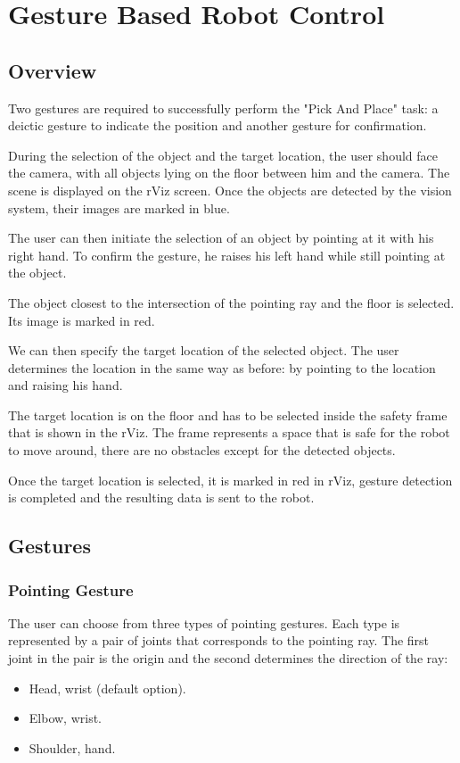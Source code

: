 \chapter{Gesture Based Robot Control}

\section{Overview}
Two gestures are required to successfully perform the "Pick And Place" task:
a deictic gesture to indicate the position and another gesture for confirmation.\par
During the selection of the object and the target location, the user should face the camera, with all objects lying on the floor between him and the camera. The scene is displayed on the rViz screen. Once the objects are detected by the vision system, their images are marked in blue.\par
The user can then initiate the selection of an object by pointing at it with his right hand. To confirm the gesture, he raises his left hand while still pointing at the object.\par
The object closest to the intersection of the pointing ray and the floor is selected. Its image is marked in red.\par
We can then specify the target location of the selected object. The user determines the location in the same way as before: by pointing to the location and raising his hand.\par
The target location is on the floor and  has to be selected inside the safety frame that is shown in the rViz. The frame represents a space that is safe for the robot to move around, there are no obstacles except for the detected objects.\par
Once the target location is selected, it is marked in red in rViz, gesture detection is completed and the resulting data is sent to the robot.\par

\section{Gestures}

\subsection{Pointing Gesture}
The user can choose from three types of pointing gestures. Each type is represented by a pair of joints that corresponds to the pointing ray. The first joint in the pair is the origin and the second determines the direction of the ray:\par
\begin{itemize}
	\item Head, wrist (default option).
    \item Elbow, wrist.
    \item Shoulder, hand.
\end{itemize}

